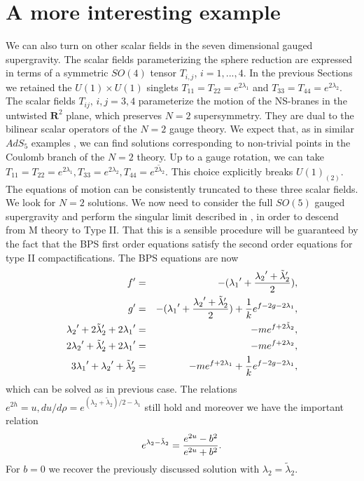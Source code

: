 \documentclass[a4paper,12pt]{article}
\begin{document}
\section{A more interesting example}
We can also turn on other scalar fields in the seven dimensional gauged supergravity. The scalar fields parameterizing the sphere reduction are
expressed in terms of a symmetric $SO(4)$ tensor $T_{i,j}$, $i=1,...,4$.
In the previous Sections we retained the $U(1)\times U(1)$ 
singlets $T_{11}=T_{22}=e^{2\lambda_1}$ and 
$T_{33}=T_{44}=e^{2\lambda_2}$. The scalar fields $T_{ij},\, i,j=3,4$
parameterize the motion of the NS-branes in the untwisted $\mathbf{R}^2$ plane,
which preserves $N=2$ supersymmetry. They are dual to the bilinear scalar 
operators of the $N=2$ gauge theory. 
We expect that, as in similar $AdS_5$ examples \cite{freed2,pw}, we can
find solutions corresponding to non-trivial points in the Coulomb branch
of the $N=2$ theory. Up to a gauge rotation, we can take
$T_{11}=T_{22}=e^{2\lambda_1},T_{33}=e^{2\lambda_2},T_{44}=e^{2\tilde\lambda_2}$. This choice explicitly breaks $U(1)_{(2)}$. 
The equations of motion can be consistently truncated to
these three scalar fields. We look for $N=2$ solutions. We now need to
consider the full $SO(5)$ gauged supergravity and perform the
singular limit described in \cite{cve2}, in order to
descend from M theory to Type II. That this is a sensible
procedure will be guaranteed by the fact that the BPS first order
equations satisfy the second order equations \cite{cve1} for
type II compactifications. The BPS equations are now
\begin{eqnarray}
f' &=& -({\lambda_{1}}' +{{{\lambda_{2}}'+{\tilde\lambda_2}'}\over 2}),\nonumber \\
g' &=& -({\lambda_{1}}' +{{\lambda_{2}}'+{\tilde\lambda_2}'\over 2}) +{1\over k}e^{f-2g-2\lambda_{1}},\nonumber \\
{\lambda_{2}}'+2{\tilde\lambda_{2}}'+2{\lambda_{1}}' &=& -me^{f+2\tilde\lambda_{2}},\nonumber \\
{2\lambda_{2}}'+{\tilde\lambda_{2}}'+2{\lambda_{1}}' &=& -me^{f+2\lambda_{2}},\nonumber \\
3{\lambda_{1}}'+{\lambda_{2}}'+{\tilde\lambda_{2}}' &=& -me^{f+2\lambda_{1}}+{1\over k}e^{f-2g-2\lambda_{1}},
\label{first2}
\end{eqnarray}
which can be solved as in previous case. 
The relations $e^{2h}=u, du/d\rho=e^{(\lambda_{2}+\tilde\lambda_{2})/2- \lambda_{1}}$ still hold and moreover we have
the important relation
\begin{equation}
e^{\lambda_{2}-\tilde\lambda_{2}}={e^{2u}-b^2\over e^{2u}+b^2}.
\label{diff}
\end{equation}
For $b=0$ we recover the previously discussed solution with $\lambda_{2}=\tilde\lambda_{2}$. 
\end{document}
